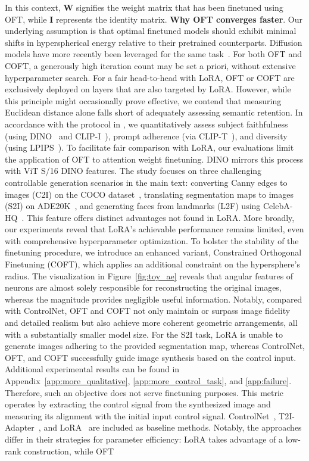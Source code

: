 {In this context, $\bm{W}$ signifies the weight matrix that has been finetuned using OFT, while $\bm{I}$ represents the identity matrix. \textbf{Why OFT converges faster}. Our underlying assumption is that optimal finetuned models should exhibit minimal shifts in hyperspherical energy relative to their pretrained counterparts. Diffusion models have more recently been leveraged for the same task~\cite{saharia2022palette,voynov2022sketch,wang2022pretraining}. For both OFT and COFT, a generously high iteration count may be set a priori, without extensive hyperparameter search. For a fair head-to-head with LoRA, OFT or COFT are exclusively deployed on layers that are also targeted by LoRA. However, while this principle might occasionally prove effective, we contend that measuring Euclidean distance alone falls short of adequately assessing semantic retention. In accordance with the protocol in \cite{ruiz2023dreambooth}, we quantitatively assess subject faithfulness (using DINO~\cite{caron2021emerging} and CLIP-I~\cite{radford2021learning}), prompt adherence (via CLIP-T~\cite{radford2021learning}), and diversity (using LPIPS~\cite{zhang2018unreasonable}). To facilitate fair comparison with LoRA, our evaluations limit the application of OFT to attention weight finetuning. DINO mirrors this process with ViT S/16 DINO features. The study focuses on three challenging controllable generation scenarios in the main text: converting Canny edges to images (C2I) on the COCO dataset~\cite{lin2014microsoft}, translating segmentation maps to images (S2I) on ADE20K~\cite{zhou2017scene}, and generating faces from landmarks (L2F) using CelebA-HQ~\cite{karras2018progressive,xia2021tedigan}. This feature offers distinct advantages not found in LoRA. More broadly, our experiments reveal that LoRA’s achievable performance remains limited, even with comprehensive hyperparameter optimization. To bolster the stability of the finetuning procedure, we introduce an enhanced variant, Constrained Orthogonal Finetuning (COFT), which applies an additional constraint on the hypersphere’s radius. The visualization in Figure~\ref{fig:toy_ae} reveals that angular features of neurons are almost solely responsible for reconstructing the original images, whereas the magnitude provides negligible useful information. Notably, compared with ControlNet, OFT and COFT not only maintain or surpass image fidelity and detailed realism but also achieve more coherent geometric arrangements, all with a substantially smaller model size. For the S2I task, LoRA is unable to generate images adhering to the provided segmentation map, whereas ControlNet, OFT, and COFT successfully guide image synthesis based on the control input. Additional experimental results can be found in Appendix~\ref{app:more_qualitative}, \ref{app:more_control_task}, and \ref{app:failure}. Therefore, such an objective does not serve finetuning purposes. This metric operates by extracting the control signal from the synthesized image and measuring its alignment with the initial input control signal. ControlNet~\cite{zhang2023adding}, T2I-Adapter~\cite{mou2023t2i}, and LoRA~\cite{hulora2022} are included as baseline methods. Notably, the approaches differ in their strategies for parameter efficiency: LoRA takes advantage of a low-rank construction, while OFT }
